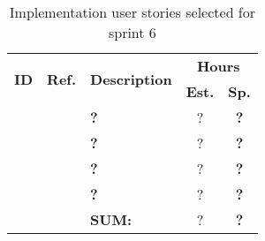  \def\arraystretch{1.25}
 
\begin{longtable}{ccXcc}
  \label{tab:sprint6stories}\\[-6mm]
\caption{Implementation user stories selected for sprint 6}\\[-4mm]

\toprule[0.5mm]
\multirow{2}{*}{\textbf{ID}} &
\multirow{2}{*}{\textbf{Ref.}} & \multirow{2}{*}{\textbf{Description}} & \multicolumn{2}{c}{\textbf{Hours}} \\
 					& & & \textbf{Est.} & \textbf{Sp.} \\
\midrule
\textbf{} 	& {?}	& {\bf ?}			& ?	& \textbf{?} \\

\textbf{} 	& {?}	& {\bf ?}			& ?	& \textbf{?} \\

\textbf{} 	& {?}	& {\bf ?} 			& ?	& \textbf{?} \\	

\textbf{} 	& {?}	& {\bf ?} 			& ?	& \textbf{?} \\
	
\midrule
		
				&& \textbf{SUM:}		&	?	& \textbf{?}
 \\																			
\bottomrule[0.5mm]
\end{longtable}

